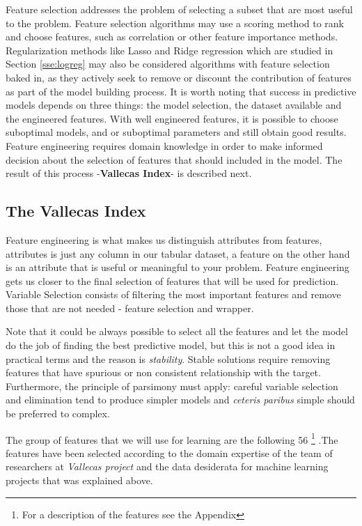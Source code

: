 \documentclass[11pt]{article}
\theoremstyle{definition}
\theoremstyle{remark}
\begin{document}
Feature selection addresses the problem of selecting a subset that are most useful to the problem. Feature selection algorithms may use a scoring method to rank and choose features, such as correlation or other feature importance methods. Regularization methods like Lasso and Ridge regression which are studied in Section \ref{sse:logreg} may also be considered algorithms with feature selection baked in, as they actively seek to remove or discount the contribution of features as part of the model building process. 
It is worth noting that success in predictive models depends on three things: the model selection, the dataset available and the engineered features. With well engineered features, it is possible to choose suboptimal models, and or suboptimal parameters and still obtain good results. Feature engineering requires domain knowledge in order to make informed decision about the selection of features that should included in the model. The result of this process -\textbf{Vallecas Index}- is described next. 


\subsection{The Vallecas Index}
\label{sse:vs}
Feature engineering is what makes us distinguish attributes from features, attributes is just any column in our tabular dataset, a feature on the other hand is an attribute that is useful or meaningful to your problem. Feature engineering gets us closer to the final selection of features that will be used for prediction. 
Variable Selection consists of filtering the most important features and remove those that are not needed - feature selection and wrapper.


Note that it could be always possible to select all the features and let the model do the job of finding the best predictive model, but this is not a good idea in practical terms and the reason is \emph{stability}. Stable solutions require removing features that have spurious or non consistent relationship with the target. Furthermore, the principle of parsimony must apply: careful variable selection and elimination tend to produce simpler models and \emph{ceteris paribus} simple should be preferred to complex.

The group of features that we will use for learning are the following 56 \footnote{For a description of the features see the Appendix} .The features have been selected according to the domain expertise of the team of researchers at \emph{Vallecas project} and the data desiderata for machine learning projects that was explained above. 
\end{document}
